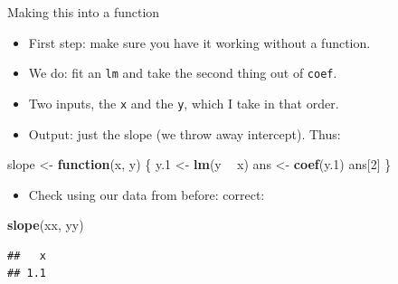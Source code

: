 \documentclass[
  ignorenonframetext,
]{beamer}
\newenvironment{Shaded}{\begin{snugshade}}{\end{snugshade}}
\newcommand{\ControlFlowTok}[1]{\textcolor[rgb]{0.13,0.29,0.53}{\textbf{#1}}}
\newcommand{\DecValTok}[1]{\textcolor[rgb]{0.00,0.00,0.81}{#1}}
\newcommand{\FloatTok}[1]{\textcolor[rgb]{0.00,0.00,0.81}{#1}}
\newcommand{\KeywordTok}[1]{\textcolor[rgb]{0.13,0.29,0.53}{\textbf{#1}}}
\newcommand{\NormalTok}[1]{#1}
\newcommand{\OperatorTok}[1]{\textcolor[rgb]{0.81,0.36,0.00}{\textbf{#1}}}
\newcommand{\StringTok}[1]{\textcolor[rgb]{0.31,0.60,0.02}{#1}}
\providecommand{\tightlist}{%
  \setlength{\itemsep}{0pt}\setlength{\parskip}{0pt}}
\begin{document}
\begin{frame}[fragile]{Making this into a function}
\protect\hypertarget{making-this-into-a-function}{}

\begin{itemize}
\tightlist
\item
  First step: make sure you have it working without a function.
\item
  We do: fit an \texttt{lm} and take the second thing out of
  \texttt{coef}.
\item
  Two inputs, the \texttt{x} and the \texttt{y}, which I take in that
  order.
\item
  Output: just the slope (we throw away intercept). Thus:
\end{itemize}

\begin{Shaded}
\begin{Highlighting}[]
\NormalTok{slope <-}\StringTok{ }\ControlFlowTok{function}\NormalTok{(x, y) \{}
\NormalTok{  y}\FloatTok{.1}\NormalTok{ <-}\StringTok{ }\KeywordTok{lm}\NormalTok{(y }\OperatorTok{~}\StringTok{ }\NormalTok{x)}
\NormalTok{  ans <-}\StringTok{ }\KeywordTok{coef}\NormalTok{(y}\FloatTok{.1}\NormalTok{)}
\NormalTok{  ans[}\DecValTok{2}\NormalTok{]}
\NormalTok{\}}
\end{Highlighting}
\end{Shaded}

\begin{itemize}
\tightlist
\item
  Check using our data from before: correct:
\end{itemize}

\begin{Shaded}
\begin{Highlighting}[]
\KeywordTok{slope}\NormalTok{(xx, yy)}
\end{Highlighting}
\end{Shaded}

\begin{verbatim}
##   x 
## 1.1
\end{verbatim}

\end{frame}
\end{document}

